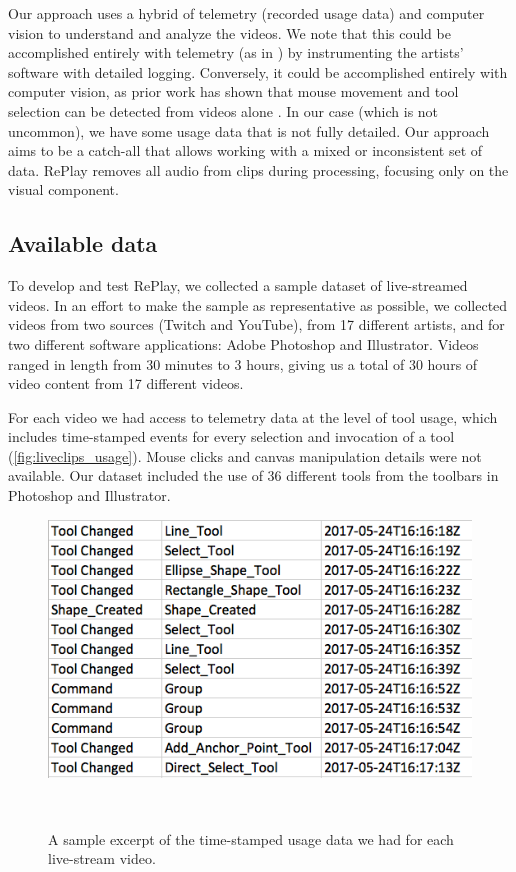 Our approach uses a hybrid of telemetry (recorded usage data) and computer vision to understand and analyze the videos. We note that this could be accomplished entirely with telemetry (as in \cite{Grossman2010, Lafreniere2014}) by instrumenting the artists' software with detailed logging. Conversely, it could be accomplished entirely with computer vision, as prior work has shown that mouse movement and tool selection can be detected from videos alone \cite{Banovic2012, Pongnumkul2011}. In our case (which is not uncommon), we have some usage data that is not fully detailed. Our approach aims to be a catch-all that allows working with a mixed or inconsistent set of data. RePlay removes all audio from clips during processing, focusing only on the visual component.

\subsection{Available data}
To develop and test RePlay, we collected a sample dataset of live-streamed videos. In an effort to make the sample as representative as possible, we collected videos from two sources (Twitch and YouTube), from 17 different artists, and for two different software applications: Adobe Photoshop and Illustrator. Videos ranged in length from 30 minutes to 3 hours, giving us a total of 30 hours of video content from 17 different videos. 

For each video we had access to telemetry data at the level of tool usage, which includes time-stamped events for every selection and invocation of a tool (\autoref{fig:liveclips_usage}). Mouse clicks and canvas manipulation details were not available. Our dataset included the use of 36 different tools from the toolbars in Photoshop and Illustrator.  

\begin{figure}[b]
\centering
  \includegraphics[width=0.8\columnwidth]{liveclips/figures/usage.png}
  \caption{A sample excerpt of the time-stamped usage data we had for each live-stream video.}~\label{fig:liveclips_usage}
\end{figure}



